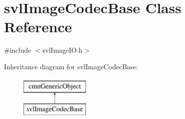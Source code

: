 \hypertarget{classsvl_image_codec_base}{\section{svl\-Image\-Codec\-Base Class Reference}
\label{classsvl_image_codec_base}
}


{\ttfamily \#include $<$svl\-Image\-I\-O.\-h$>$}

Inheritance diagram for svl\-Image\-Codec\-Base\-:\begin{figure}[H]
\begin{center}
\leavevmode
\includegraphics[height=2.000000cm]{d7/d01/classsvl_image_codec_base}
\end{center}
\end{figure}
